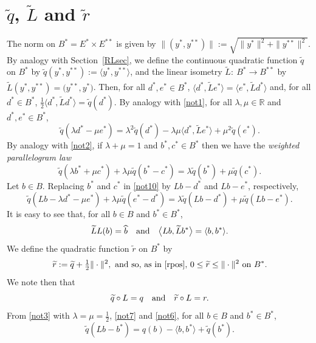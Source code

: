\documentclass[letterpaper]{article}
\theoremstyle{plain}
\theoremstyle{definition}
\numberwithin{equation}{section}
\newcommand{\bra}[2]{\langle#1,#2\rangle}
\newcommand{\Bra}[2]{\big\langle#1,#2\big\rangle}
\newcommand{\dbs}{^{**}}
\newcommand{\half}{{\textstyle\frac{1}{2}}}
\newcommand{\Lt}{{\wt L}}
\newcommand{\on}{\hbox{on}}
\newcommand{\qt}{\wt q}
\newcommand{\quand}{\quad\hbox{and}\quad}
\newcommand{\RR}{\mathbb R}
\newcommand{\rt}{\wt r}
\newcommand{\wh}{\widehat}
\newcommand{\wt}{\widetilde}
\newcommand{\Sec}{Section~\ref}
\begin{document}
\section{$\qt$, $\Lt$ and $\rt$}\label{RLTsec}
The norm on $B^* = E^* \times E\dbs$ is given by  $\|(y^*,y\dbs)\| := \sqrt{\|y^*\|^2 + \|y\dbs\|^2}$. 
By analogy with \Sec{RLsec}, we define the continuous quadratic function $\qt$ on $B^*$ by $\qt(y^*,y\dbs) := \bra {y^*}{y\dbs}$, and the linear isometry $\Lt\colon\ B^* \to B\dbs$ by $\Lt(y^*,y\dbs) = \big(y\dbs,\wh{y^*}\big)$.      Then, for all $d^*,e^*\in B^*$, $\Bra{d^*}{\Lt e^*} = \Bra{e^*}{\Lt d^*}$ and, for all $d^* \in B^*$, $\half\Bra{d^*}{\Lt d^*} = \qt(d^*)$.   By analogy with \eqref{not1}, for all $\lambda,\mu \in \RR$ and $d^*,e^* \in B^*$,
\begin{equation}\label{not3}
\qt(\lambda d^* - \mu e^*) = \lambda^2\qt(d^*) - \lambda\mu \Bra{d^*}{\Lt e^*} + \mu^2\qt(e^*).
\end{equation}
By analogy with \eqref{not2}, if $\lambda + \mu = 1$ and  $b^*,c^* \in B^*$ then we have the {\em weighted parallelogram law}
\begin{equation}\label{not10}
\qt(\lambda b^* + \mu c^*) + \lambda\mu \qt(b^* - c^*) = \lambda \qt(b^*) + \mu \qt(c^*).
\end{equation}
%
%
Let $b \in B$.   Replacing $b^*$ and $c^*$ in \eqref{not10} by $Lb - d^*$ and $Lb - e^*$, respectively, 
\begin{equation}\label{not4}
\qt(Lb - \lambda d^* - \mu e^*) + \lambda\mu\qt(e^* - d^*) = \lambda\qt(Lb - d^*) + \mu\qt(Lb - e^*).
\end{equation}
%
It is easy to see that, for all $b \in B$ and $b^* \in B^*$,
\begin{equation}\label{not6}
\Lt L(b) = \wh b\quand\Bra{Lb}{\Lt b^*} =  \bra{b}{b^*}.
\end{equation}
%
We define the quadratic function $\rt$ on $B^*$ by 
\begin{equation}\label{rtdef}
\rt := \qt+ \half\|\cdot\|^2, \hbox{ and so, as in \eqref{rpos}, } 0 \le \rt \le \|\cdot\|^2\ \on\ B^*.
\end{equation}
We note then that
\begin{equation}\label{not7}
\qt \circ L = q \quand \rt\circ L = r.
\end{equation}
%
From \eqref{not3} with $\lambda = \mu = \half$, \eqref{not7} and \eqref{not6}, for all $b \in B$ and $b^* \in B^*$, 
\begin{equation}\label{not9}
\qt(Lb - b^*) = q(b) - \bra{b}{b^*} + \qt(b^*).
\end{equation}
\end{document}
